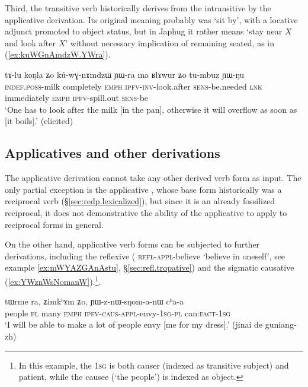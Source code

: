 Third, the transitive verb  historically derives from the intransitive  by the applicative derivation. Its original meaning probably was `sit by', with a locative adjunct promoted to object status, but in Japhug it rather means `stay near $X$ and look after $X$' without necessary implication of remaining seated, as in (\ref{ex:kuWGnAmdzW.YWra}).

\begin{exe}
\ex \label{ex:kuWGnAmdzW.YWra}
\gll tɤ-lu koŋla ʑo kú-wɣ-nɤmdzɯ ɲɯ-ra ma ʁlɤwur ʑo tu-mbuz ɲɯ-ŋu \\
\textsc{indef}.\textsc{poss}-milk completely \textsc{emph} \textsc{ipfv}-\textsc{inv}-look.after \textsc{sens}-be.needed \textsc{lnk} immediately \textsc{emph} \textsc{ipfv}-spill.out \textsc{sens}-be \\
\glt `One has to look after the milk [in the pan], otherwise it will overflow as soon as [it boils].' (elicited)
\end{exe}
 
 
\subsection{Applicatives and other derivations} \label{sec:appl.other.derivations}
The applicative derivation cannot take any other derived verb form as input. The only partial exception is the applicative , whose base form  historically was a reciprocal verb (§\ref{sec:redp.lexicalized}), but since it is an already fossilized reciprocal, it does not demonstrative the ability of the applicative to apply to reciprocal forms in general.

On the other hand, applicative verb forms can be subjected to further derivations, including the reflexive  ( \textsc{refl}-\textsc{appl}-believe `believe in oneself', see example \ref{ex:mWYAZGAnAstu}, §\ref{sec:refl.tropative}) and the sigmatic causative (\ref{ex:YWznWsNomanW}).\footnote{In this example, the \textsc{1sg} is both causer (indexed as transitive subject) and patient, while the causee (`the people') is indexed as object. }. 

\begin{exe}
\ex \label{ex:YWznWsNomanW}
\gll tɯrme ra, ʑimkʰɤm ʑo, ɲɯ-z-nɯ-sŋom-a-nɯ cʰa-a \\
people \textsc{pl} many \textsc{emph} \textsc{ipfv}-\textsc{caus}-\textsc{appl}-envy-\textsc{1sg}-\textsc{pl} can:\textsc{fact}-\textsc{1sg} \\
\glt `I will be able to make a lot of people envy [me for my dress].' (jinai de guniang-zh)
\end{exe}

